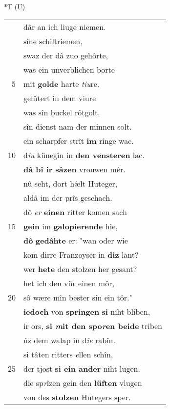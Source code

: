 \documentclass[8pt,a4paper,notitlepage]{article}
\begin{document}
\begin{table}[ht]
\begin{minipage}[t]{0.5\linewidth}
\end{minipage}
\hspace{0.5cm}
\begin{minipage}[t]{0.5\linewidth}
\small
\begin{center}*T (U)
\end{center}
\begin{tabular}{rl}
 & dâr an ich liuge niemen.\\ 
 & sîne schiltriemen,\\ 
 & swaz der dâ zuo gehôrte,\\ 
 & was ein unverblichen borte\\ 
5 & mit \textbf{golde} harte \textit{tiu}re.\\ 
 & gelûtert in dem viure\\ 
 & was sîn buckel rôtgolt.\\ 
 & sîn dienst nam der minnen solt.\\ 
 & ein scharpfer strît \textbf{im} ringe wac.\\ 
10 & d\textit{iu} künegîn in \textbf{den vensteren} lac.\\ 
 & \textbf{dâ bî ir sâzen} vrouwen mêr.\\ 
 & nû seht, dort h\textit{i}elt Huteger,\\ 
 & aldâ im der prîs geschach.\\ 
 & dô \textit{er} \textbf{einen} ritter komen sach\\ 
15 & \textbf{gein} im \textbf{galopierende} hie,\\ 
 & \textbf{dô} \textbf{gedâhte} er: "wan oder wie\\ 
 & kom dirre Franzoyser in \textbf{diz} lant?\\ 
 & wer \textbf{hete} den stolzen her gesant?\\ 
 & het ich den vür einen môr,\\ 
20 & sô wære mîn bester sin ein tôr."\\ 
 & \textbf{iedoch} von \textbf{springen} \textbf{si} niht bliben,\\ 
 & ir ors, \textbf{si \textit{m}it den spo\textit{r}en beide} triben\\ 
 & ûz dem walap in d\textit{ie} rabîn.\\ 
 & si tâten ritters \textit{e}llen schîn,\\ 
25 & der tjost \textbf{si ein ander} niht lugen.\\ 
 & die sp\textit{r}îzen gein den \textbf{lüften} vlugen\\ 
 & von des \textbf{stolzen} Hutegers sper.\\ 

\end{tabular}
\end{minipage}
\end{table}
\end{document}
